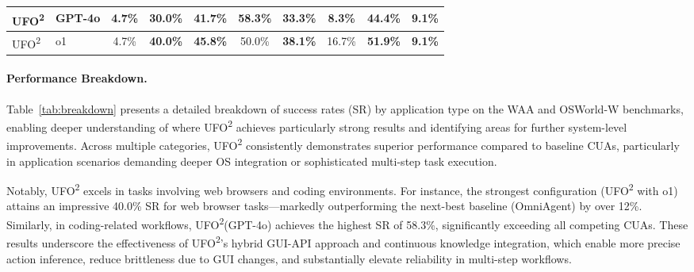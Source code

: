 \documentclass[sigplan,10pt]{acmart}
\newcommand{\name}{\textsc{UFO}\textsuperscript{2}\xspace}
\begin{document}
\begin{table}[t]
\begin{tabular}{l|l|cccccc|cc}
\name                           & GPT-4o                          & \multicolumn{1}{c|}{4.7\%}        & \multicolumn{1}{c|}{30.0\%}                                                 & \multicolumn{1}{c|}{41.7\%}                                                    & \multicolumn{1}{c|}{\textbf{58.3\%}} & \multicolumn{1}{c|}{33.3\%}                                                    & 8.3\%                                                    & \multicolumn{1}{c|}{44.4\%}          & \textbf{9.1\%} \\ \hline
\name                           & o1                              & \multicolumn{1}{c|}{4.7\%}        & \multicolumn{1}{c|}{\textbf{40.0\%}}                                        & \multicolumn{1}{c|}{\textbf{45.8\%}}                                           & \multicolumn{1}{c|}{50.0\%}          & \multicolumn{1}{c|}{\textbf{38.1\%}}                                           & 16.7\%                                                   & \multicolumn{1}{c|}{\textbf{51.9\%}} & \textbf{9.1\%} \\ \hline
\end{tabular}
\end{table}

\paragraph{Performance Breakdown.} 
Table~\ref{tab:breakdown} presents a detailed breakdown of success rates (SR) by application type on the WAA and OSWorld-W benchmarks, enabling deeper understanding of where \name achieves particularly strong results and identifying areas for further system-level improvements. Across multiple categories, \name consistently demonstrates superior performance compared to baseline CUAs, particularly in application scenarios demanding deeper OS integration or sophisticated multi-step task execution.

Notably, \name excels in tasks involving web browsers and coding environments. For instance, the strongest configuration (\name with o1) attains an impressive 40.0\% SR for web browser tasks—markedly outperforming the next-best baseline (OmniAgent) by over 12\%. Similarly, in coding-related workflows, \name (GPT-4o) achieves the highest SR of 58.3\%, significantly exceeding all competing CUAs. These results underscore the effectiveness of \name's hybrid GUI-API approach and continuous knowledge integration, which enable more precise action inference, reduce brittleness due to GUI changes, and substantially elevate reliability in multi-step workflows.
\end{document}
